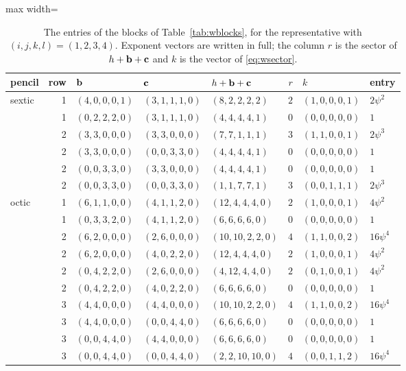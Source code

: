 \begin{table}[t]
\caption{The entries of the blocks of Table~\ref{tab:wblocks}, for the
representative with $(i,j,k,l)=(1,2,3,4)$. Exponent vectors are written in
full; the column $r$ is the sector of $h+\mathbf{b}+\mathbf{c}$ and $k$ is the vector of
\eqref{eq:wsector}.}
\label{tab:wblockdata}
\centering
\footnotesize
\begin{adjustbox}{max width=\linewidth}\begin{tabular}{lrlllrll}
\toprule
pencil & row & $\mathbf{b}$ & $\mathbf{c}$ & $h+\mathbf{b}+\mathbf{c}$ & $r$ & $k$ & entry\\
\midrule
sextic & 1 & $(4,0,0,0,1)$ & $(3,1,1,1,0)$ & $(8,2,2,2,2)$ & $2$ & $(1,0,0,0,1)$ & $2\psi^{2}$\\
 & 1 & $(0,2,2,2,0)$ & $(3,1,1,1,0)$ & $(4,4,4,4,1)$ & $0$ & $(0,0,0,0,0)$ & $1$\\
 & 2 & $(3,3,0,0,0)$ & $(3,3,0,0,0)$ & $(7,7,1,1,1)$ & $3$ & $(1,1,0,0,1)$ & $2\psi^{3}$\\
 & 2 & $(3,3,0,0,0)$ & $(0,0,3,3,0)$ & $(4,4,4,4,1)$ & $0$ & $(0,0,0,0,0)$ & $1$\\
 & 2 & $(0,0,3,3,0)$ & $(3,3,0,0,0)$ & $(4,4,4,4,1)$ & $0$ & $(0,0,0,0,0)$ & $1$\\
 & 2 & $(0,0,3,3,0)$ & $(0,0,3,3,0)$ & $(1,1,7,7,1)$ & $3$ & $(0,0,1,1,1)$ & $2\psi^{3}$\\
\midrule
octic & 1 & $(6,1,1,0,0)$ & $(4,1,1,2,0)$ & $(12,4,4,4,0)$ & $2$ & $(1,0,0,0,1)$ & $4\psi^{2}$\\
 & 1 & $(0,3,3,2,0)$ & $(4,1,1,2,0)$ & $(6,6,6,6,0)$ & $0$ & $(0,0,0,0,0)$ & $1$\\
 & 2 & $(6,2,0,0,0)$ & $(2,6,0,0,0)$ & $(10,10,2,2,0)$ & $4$ & $(1,1,0,0,2)$ & $16\psi^{4}$\\
 & 2 & $(6,2,0,0,0)$ & $(4,0,2,2,0)$ & $(12,4,4,4,0)$ & $2$ & $(1,0,0,0,1)$ & $4\psi^{2}$\\
 & 2 & $(0,4,2,2,0)$ & $(2,6,0,0,0)$ & $(4,12,4,4,0)$ & $2$ & $(0,1,0,0,1)$ & $4\psi^{2}$\\
 & 2 & $(0,4,2,2,0)$ & $(4,0,2,2,0)$ & $(6,6,6,6,0)$ & $0$ & $(0,0,0,0,0)$ & $1$\\
 & 3 & $(4,4,0,0,0)$ & $(4,4,0,0,0)$ & $(10,10,2,2,0)$ & $4$ & $(1,1,0,0,2)$ & $16\psi^{4}$\\
 & 3 & $(4,4,0,0,0)$ & $(0,0,4,4,0)$ & $(6,6,6,6,0)$ & $0$ & $(0,0,0,0,0)$ & $1$\\
 & 3 & $(0,0,4,4,0)$ & $(4,4,0,0,0)$ & $(6,6,6,6,0)$ & $0$ & $(0,0,0,0,0)$ & $1$\\
 & 3 & $(0,0,4,4,0)$ & $(0,0,4,4,0)$ & $(2,2,10,10,0)$ & $4$ & $(0,0,1,1,2)$ & $16\psi^{4}$\\

\end{tabular}
\end{adjustbox}
\end{table}
